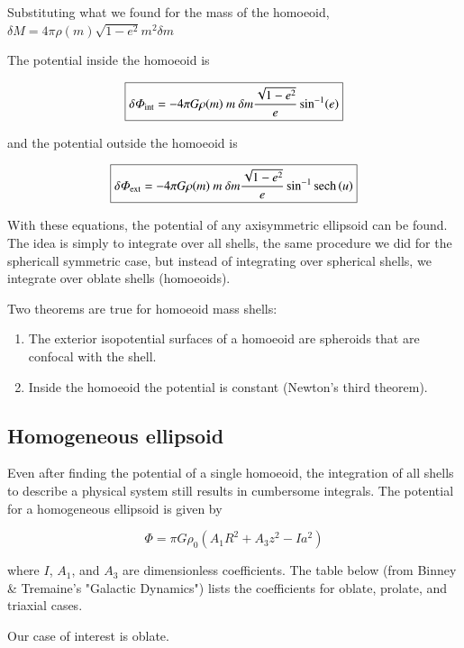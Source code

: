 Substituting what we found for the mass of the homoeoid, $\delta M = 4\pi \rho(m) \sqrt{1-e^2} m^2 \delta m$

The potential inside the homoeoid is  


\begin{equation}
\boxed{
\delta \varPhi_{\rm int} = -4\pi G \rho(m) \ m \ \delta m \frac{\sqrt{1-e^2}}{e}\sin^{-1}(e)
}
\end{equation}

and the potential outside the homoeoid is 


\begin{equation}
\boxed{
\delta \varPhi_{\rm ext} = -4\pi G \rho(m) \ m \ \delta m \frac{\sqrt{1-e^2}}{e}\sin^{-1} \mathrm{sech}\left(u\right)
}
\end{equation}


With these equations, the potential of any axisymmetric ellipsoid can be found. The idea is simply to integrate over all shells, the same procedure we did for the sphericall symmetric case, but instead of integrating over spherical shells, we integrate over oblate shells (homoeoids). 

Two theorems are true for homoeoid mass shells: 
\begin{enumerate}
\item The exterior isopotential surfaces of a homoeoid are spheroids that are confocal with the shell. 
\item Inside the homoeoid the potential is constant (Newton's third theorem).
\end{enumerate}

\subsection{Homogeneous ellipsoid}

Even after finding the potential of a single homoeoid, the integration of all shells to describe a physical system still results in cumbersome integrals. The potential for a homogeneous ellipsoid is given by

\begin{equation}
\varPhi = \pi G \rho_0 \left(A_1 R^2 + A_3 z^2 - Ia^2 \right) 
\end{equation}

where $I$, $A_1$, and $A_3$ are dimensionless coefficients. The table below (from Binney \& Tremaine's "Galactic Dynamics") lists the coefficients for oblate, prolate, and triaxial cases. 


Our case of interest is oblate.

